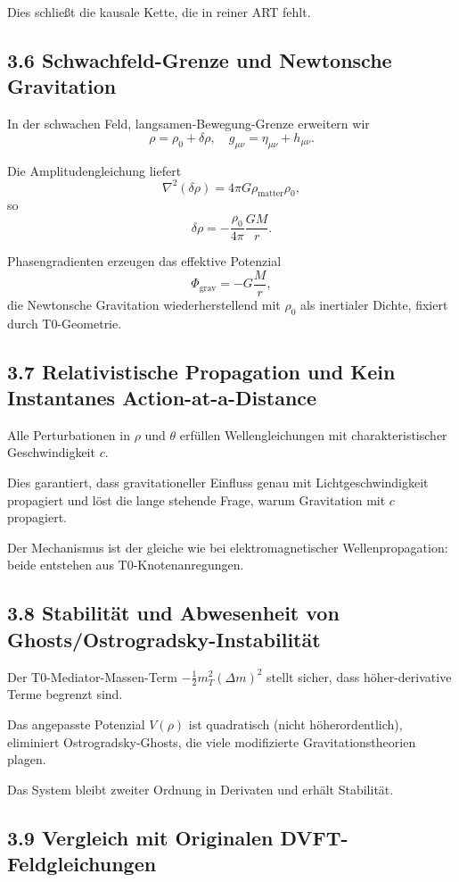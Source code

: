 	
	Dies schließt die kausale Kette, die in reiner ART fehlt.
	
	\subsection{3.6 Schwachfeld-Grenze und Newtonsche Gravitation}
	
	In der schwachen Feld, langsamen-Bewegung-Grenze erweitern wir
	\[
	\rho = \rho_0 + \delta \rho, \quad g_{\mu\nu} = \eta_{\mu\nu} + h_{\mu\nu}.
	\]
	
	Die Amplitudengleichung liefert
	\[
	\nabla^2 (\delta \rho) = 4\pi G \rho_{\text{matter}} \rho_0,
	\]
	so
	\[
	\delta \rho = -\frac{\rho_0}{4\pi} \frac{GM}{r}.
	\]
	
	Phasengradienten erzeugen das effektive Potenzial
	\[
	\Phi_{\text{grav}} = -G \frac{M}{r},
	\]
	die Newtonsche Gravitation wiederherstellend mit $\rho_0$ als inertialer Dichte, fixiert durch T0-Geometrie.
	
	\subsection{3.7 Relativistische Propagation und Kein Instantanes Action-at-a-Distance}
	
	Alle Perturbationen in $\rho$ und $\theta$ erfüllen Wellengleichungen mit charakteristischer Geschwindigkeit $c$.
	
	Dies garantiert, dass gravitationeller Einfluss genau mit Lichtgeschwindigkeit propagiert und löst die lange stehende Frage, warum Gravitation mit $c$ propagiert.
	
	Der Mechanismus ist der gleiche wie bei elektromagnetischer Wellenpropagation: beide entstehen aus T0-Knotenanregungen.
	
	\subsection{3.8 Stabilität und Abwesenheit von Ghosts/Ostrogradsky-Instabilität}
	
	Der T0-Mediator-Massen-Term $-\frac{1}{2} m_T^2 (\Delta m)^2$ stellt sicher, dass höher-derivative Terme begrenzt sind.
	
	Das angepasste Potenzial $V(\rho)$ ist quadratisch (nicht höherordentlich), eliminiert Ostrogradsky-Ghosts, die viele modifizierte Gravitationstheorien plagen.
	
	Das System bleibt zweiter Ordnung in Derivaten und erhält Stabilität.
	
	\subsection{3.9 Vergleich mit Originalen DVFT-Feldgleichungen}
	
